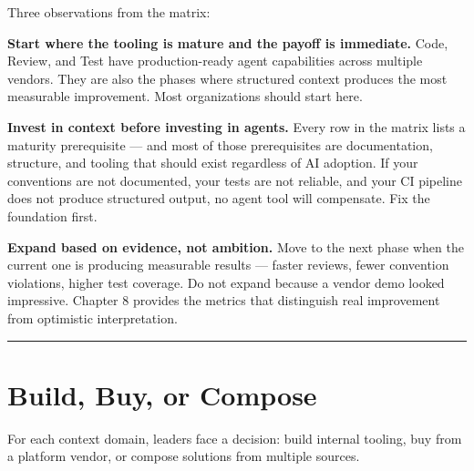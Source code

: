 \documentclass[
  a4paper,
  DIV=11,
  numbers=noendperiod]{scrreprt}
\begin{document}
Three observations from the matrix:

\textbf{Start where the tooling is mature and the payoff is immediate.}
Code, Review, and Test have production-ready agent capabilities across
multiple vendors. They are also the phases where structured context
produces the most measurable improvement. Most organizations should
start here.

\textbf{Invest in context before investing in agents.} Every row in the
matrix lists a maturity prerequisite --- and most of those prerequisites
are documentation, structure, and tooling that should exist regardless
of AI adoption. If your conventions are not documented, your tests are
not reliable, and your CI pipeline does not produce structured output,
no agent tool will compensate. Fix the foundation first.

\textbf{Expand based on evidence, not ambition.} Move to the next phase
when the current one is producing measurable results --- faster reviews,
fewer convention violations, higher test coverage. Do not expand because
a vendor demo looked impressive. Chapter 8 provides the metrics that
distinguish real improvement from optimistic interpretation.

\begin{center}\rule{0.5\linewidth}{0.5pt}\end{center}

\section{Build, Buy, or Compose}\label{build-buy-or-compose}

For each context domain, leaders face a decision: build internal
tooling, buy from a platform vendor, or compose solutions from multiple
sources.
\end{document}
